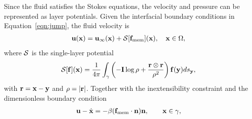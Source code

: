 \documentclass[prb,preprint,showpacs,preprintnumbers,amsmath,amssymb,longbibliography]{revtex4-1}
\begin{document}


Since the fluid satisfies the Stokes equations, the velocity and
pressure can be represented as layer potentials. Given the interfacial
boundary conditions in Equation~\eqref{eqn:jump}, the fluid velocity is
\begin{align}
  \mathbf{u}(\mathbf{x}) = \mathbf{u}_\infty(\mathbf{x}) + \mathcal{S}[\mathbf{f}_\mathrm{mem}](\mathbf{x}), \quad
    \mathbf{x} \in \Omega,
\end{align}
where $\mathcal{S}$ is the single-layer potential
\begin{align}
  \label{eqn:SLP}
  \mathcal{S}[\mathbf{f}](\mathbf{x}) = \frac{1}{4\pi} \int_{\gamma} \left(
    -\mathbf{I} \log\rho + \frac{\mathbf{r} \otimes \mathbf{r}}{\rho^2} \right)
    \mathbf{f}(\mathbf{y}) ds_{\mathbf{y}},
\end{align}
with $\mathbf{r} = \mathbf{x} - \mathbf{y}$ and $\rho = |\mathbf{r}|$. 
Together with the inextensibility constraint and the dimensionless boundary condition
\begin{align}
  \label{eqn:vesicleFlux}
  \mathbf{u} - \dot{\mathbf{x}} = - \beta (\mathbf{f}_\mathrm{mem} \cdot \mathbf{n}) \mathbf{n}, \qquad
  \mathbf{x} \in \gamma,
\end{align}
%
\end{document}
